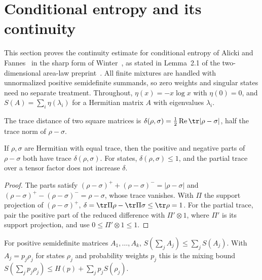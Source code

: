 \section{Conditional entropy and its continuity}

This section proves the continuity estimate for conditional entropy of
Alicki and Fannes~\cite{AlickiFannes2004Continuity} in the sharp form of
Winter~\cite[Lemma~2]{Winter2016Tight}, as stated in Lemma~2.1 of the
two-dimensional area-law preprint~\cite{OpenAI2026AreaLaw}. All finite
mixtures are handled with unnormalized positive semidefinite summands, so
zero weights and singular states need no separate treatment. Throughout,
$\eta(x)=-x\log x$ with $\eta(0)=0$, and $S(A)=\sum_i\eta(\lambda_i)$ for a
Hermitian matrix $A$ with eigenvalues $\lambda_i$.

\begin{definition}\label{def:trace_distance}
    \leanok
    The trace distance of two square matrices is
    $\delta(\rho,\sigma)=\tfrac12\operatorname{Re}\tr\lvert\rho-\sigma\rvert$,
    half the trace norm of $\rho-\sigma$.
\end{definition}

\begin{lemma}
    \label{lem:trace_distance_jordan}
    \leanok
    If $\rho,\sigma$ are Hermitian with equal trace, then the positive and
    negative parts of $\rho-\sigma$ both have trace $\delta(\rho,\sigma)$.
    For states, $\delta(\rho,\sigma)\le1$, and the partial trace over a
    tensor factor does not increase $\delta$.
\end{lemma}

\begin{proof}\leanok
    The parts satisfy $(\rho-\sigma)^++(\rho-\sigma)^-=\lvert\rho-\sigma\rvert$
    and $(\rho-\sigma)^+-(\rho-\sigma)^-=\rho-\sigma$, whose trace vanishes.
    With $\Pi$ the support projection of $(\rho-\sigma)^+$,
    $\delta=\tr\Pi\rho-\tr\Pi\sigma\le\tr\rho=1$. For the partial trace,
    pair the positive part of the reduced difference with $\Pi'\otimes1$,
    where $\Pi'$ is its support projection, and use $0\le\Pi'\otimes1\le1$.
\end{proof}

\begin{theorem}
    \label{thm:entropy_add_le}
    \leanok
    For positive semidefinite matrices $A_1,\dots,A_k$,
    $S(\sum_jA_j)\le\sum_jS(A_j)$. With $A_j=p_j\rho_j$ for states $\rho_j$
    and probability weights $p_j$ this is the mixing bound
    $S(\sum_jp_j\rho_j)\le H(p)+\sum_jp_jS(\rho_j)$.
\end{theorem}

